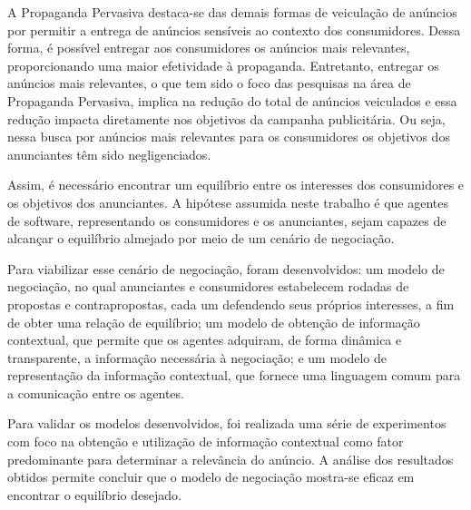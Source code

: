 A Propaganda Pervasiva destaca-se das demais formas de veiculação de anúncios por permitir a entrega de anúncios sensíveis ao contexto dos consumidores. Dessa forma, é possível entregar aos consumidores os anúncios mais relevantes, proporcionando uma maior efetividade à propaganda. Entretanto, entregar os anúncios mais relevantes, o que tem sido o foco das pesquisas na área de Propaganda Pervasiva, implica na redução do total de anúncios veiculados e essa redução impacta diretamente nos objetivos da campanha publicitária. Ou seja, nessa busca por anúncios mais relevantes para os consumidores os objetivos dos anunciantes têm sido negligenciados.

Assim, é necessário encontrar um equilíbrio entre os interesses dos consumidores e os objetivos dos anunciantes. A hipótese assumida neste trabalho é que agentes de software, representando os consumidores e os anunciantes, sejam capazes de alcançar o equilíbrio almejado por meio de um cenário de negociação. 

Para viabilizar esse cenário de negociação, foram desenvolvidos: um modelo de negociação, no qual anunciantes e consumidores estabelecem rodadas de propostas e contrapropostas, cada um defendendo seus próprios interesses, a fim de obter uma relação de equilíbrio; um modelo de obtenção de informação contextual, que permite que os agentes adquiram, de forma dinâmica e transparente, a informação necessária à negociação; e um modelo de representação da informação contextual, que fornece uma linguagem comum para a comunicação entre os agentes. 

Para validar os modelos desenvolvidos, foi realizada uma série de experimentos com foco na obtenção e utilização de informação contextual como fator predominante para determinar a relevância do anúncio. A análise dos resultados obtidos permite concluir que o modelo de negociação mostra-se eficaz em encontrar o equilíbrio desejado.
